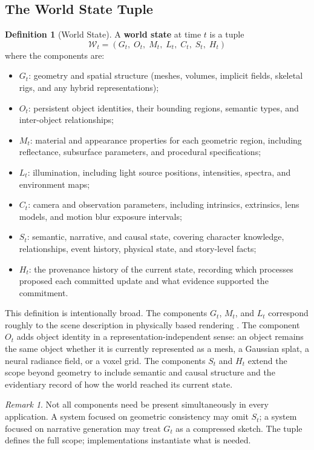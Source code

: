 \documentclass[11pt,a4paper]{article}
\theoremstyle{plain}
\theoremstyle{definition}
\newtheorem{definition}[theorem]{Definition}
\theoremstyle{remark}
\newtheorem{remark}[theorem]{Remark}
\begin{document}
\subsection{The World State Tuple}

\begin{definition}[World State]
A \textbf{world state} at time $t$ is a tuple
\[
\mathcal{W}_t = (G_t,\; O_t,\; M_t,\; L_t,\; C_t,\; S_t,\; H_t)
\]
where the components are:
\begin{itemize}[leftmargin=2em,itemsep=0pt]
\item $G_t$: geometry and spatial structure (meshes, volumes, implicit fields, skeletal rigs, and any hybrid representations);
\item $O_t$: persistent object identities, their bounding regions, semantic types, and inter-object relationships;
\item $M_t$: material and appearance properties for each geometric region, including reflectance, subsurface parameters, and procedural specifications;
\item $L_t$: illumination, including light source positions, intensities, spectra, and environment maps;
\item $C_t$: camera and observation parameters, including intrinsics, extrinsics, lens models, and motion blur exposure intervals;
\item $S_t$: semantic, narrative, and causal state, covering character knowledge, relationships, event history, physical state, and story-level facts;
\item $H_t$: the provenance history of the current state, recording which processes proposed each committed update and what evidence supported the commitment.
\end{itemize}
\end{definition}

This definition is intentionally broad. The components $G_t$, $M_t$, and $L_t$ correspond roughly to the scene description in physically based rendering \cite{pharr2023pbr}. The component $O_t$ adds object identity in a representation-independent sense: an object remains the same object whether it is currently represented as a mesh, a Gaussian splat, a neural radiance field, or a voxel grid. The components $S_t$ and $H_t$ extend the scope beyond geometry to include semantic and causal structure and the evidentiary record of how the world reached its current state.

\begin{remark}
Not all components need be present simultaneously in every application. A system focused on geometric consistency may omit $S_t$; a system focused on narrative generation may treat $G_t$ as a compressed sketch. The tuple defines the full scope; implementations instantiate what is needed.
\end{remark}
\end{document}
